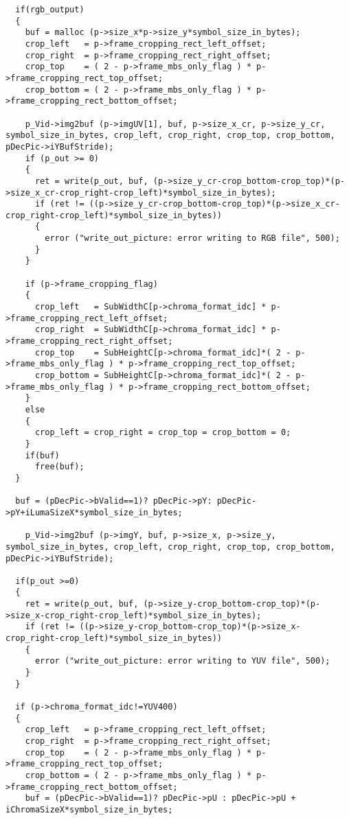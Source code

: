 \begin{lstlisting}
  if(rgb_output)
  {
    buf = malloc (p->size_x*p->size_y*symbol_size_in_bytes);
    crop_left   = p->frame_cropping_rect_left_offset;
    crop_right  = p->frame_cropping_rect_right_offset;
    crop_top    = ( 2 - p->frame_mbs_only_flag ) * p->frame_cropping_rect_top_offset;
    crop_bottom = ( 2 - p->frame_mbs_only_flag ) * p->frame_cropping_rect_bottom_offset;

    p_Vid->img2buf (p->imgUV[1], buf, p->size_x_cr, p->size_y_cr, symbol_size_in_bytes, crop_left, crop_right, crop_top, crop_bottom, pDecPic->iYBufStride);
    if (p_out >= 0)
    {
      ret = write(p_out, buf, (p->size_y_cr-crop_bottom-crop_top)*(p->size_x_cr-crop_right-crop_left)*symbol_size_in_bytes);
      if (ret != ((p->size_y_cr-crop_bottom-crop_top)*(p->size_x_cr-crop_right-crop_left)*symbol_size_in_bytes))
      {
        error ("write_out_picture: error writing to RGB file", 500);
      }
    }

    if (p->frame_cropping_flag)
    {
      crop_left   = SubWidthC[p->chroma_format_idc] * p->frame_cropping_rect_left_offset;
      crop_right  = SubWidthC[p->chroma_format_idc] * p->frame_cropping_rect_right_offset;
      crop_top    = SubHeightC[p->chroma_format_idc]*( 2 - p->frame_mbs_only_flag ) * p->frame_cropping_rect_top_offset;
      crop_bottom = SubHeightC[p->chroma_format_idc]*( 2 - p->frame_mbs_only_flag ) * p->frame_cropping_rect_bottom_offset;
    }
    else
    {
      crop_left = crop_right = crop_top = crop_bottom = 0;
    }
    if(buf) 
      free(buf);
  }

  buf = (pDecPic->bValid==1)? pDecPic->pY: pDecPic->pY+iLumaSizeX*symbol_size_in_bytes;

    p_Vid->img2buf (p->imgY, buf, p->size_x, p->size_y, symbol_size_in_bytes, crop_left, crop_right, crop_top, crop_bottom, pDecPic->iYBufStride);

  if(p_out >=0)
  {
    ret = write(p_out, buf, (p->size_y-crop_bottom-crop_top)*(p->size_x-crop_right-crop_left)*symbol_size_in_bytes);
    if (ret != ((p->size_y-crop_bottom-crop_top)*(p->size_x-crop_right-crop_left)*symbol_size_in_bytes))
    {
      error ("write_out_picture: error writing to YUV file", 500);
    }
  }

  if (p->chroma_format_idc!=YUV400)
  {
    crop_left   = p->frame_cropping_rect_left_offset;
    crop_right  = p->frame_cropping_rect_right_offset;
    crop_top    = ( 2 - p->frame_mbs_only_flag ) * p->frame_cropping_rect_top_offset;
    crop_bottom = ( 2 - p->frame_mbs_only_flag ) * p->frame_cropping_rect_bottom_offset;
    buf = (pDecPic->bValid==1)? pDecPic->pU : pDecPic->pU + iChromaSizeX*symbol_size_in_bytes;


\end{lstlisting}
